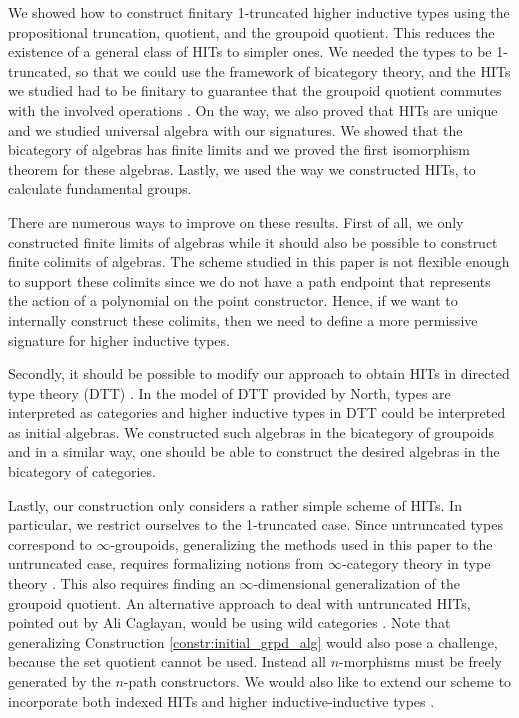 We showed how to construct finitary 1-truncated higher inductive types using the propositional truncation, quotient, and the groupoid quotient.
This reduces the existence of a general class of HITs to simpler ones.
We needed the types to be 1-truncated, so that we could use the framework of bicategory theory,
and the HITs we studied had to be finitary to guarantee that the groupoid quotient
commutes with the involved operations \cite{DBLP:journals/mscs/ChapmanUV19}.
On the way, we also proved that HITs are unique and we studied universal algebra with our signatures.
We showed that the bicategory of algebras has finite limits and we proved the first isomorphism theorem for these algebras.
Lastly, we used the way we constructed HITs, to calculate fundamental groups.

There are numerous ways to improve on these results.
First of all, we only constructed finite limits of algebras while it should also be possible to construct finite colimits of algebras.
The scheme studied in this paper is not flexible enough to support these colimits since we do not have a path endpoint that represents the action of a polynomial on the point constructor.
Hence, if we want to internally construct these colimits, then we need to define a more permissive signature for higher inductive types.

Secondly, it should be possible to modify our approach to obtain HITs in directed type theory (DTT) \cite{north2019towards}.
In the model of DTT provided by North, types are interpreted as categories and higher inductive types in DTT could be interpreted as initial algebras.
We constructed such algebras in the bicategory of groupoids and in a similar way, one should be able to construct the desired algebras in the bicategory of categories.

Lastly, our construction only considers a rather simple scheme of HITs.
In particular, we restrict ourselves to the 1-truncated case. %
Since untruncated types correspond to $\infty$-groupoids,
generalizing the methods used in this paper to the untruncated case,
requires formalizing notions from $\infty$-category theory in type theory
\cite{DBLP:conf/csl/AltenkirchR12,DBLP:journals/pacmpl/CapriottiK18,FinsterM17}.
This also requires finding an $\infty$-dimensional generalization of the groupoid quotient.
An alternative approach to deal with untruncated HITs, pointed out by Ali Caglayan,
would be using wild categories \cite{DBLP:conf/tlca/HirschowitzHT15,KrausRaumer}.
Note that generalizing Construction \ref{constr:initial_grpd_alg} would also pose a challenge, because the set quotient cannot be used.
Instead all $n$-morphisms must be freely generated by the $n$-path constructors.
We would also like to extend our scheme to incorporate both indexed HITs and higher inductive-inductive types \cite{CavalloH19,KaposiK18}.
